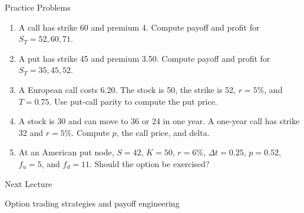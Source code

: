\documentclass[aspectratio=169,11pt]{beamer}
\begin{document}
\begin{frame}{Practice Problems}
    \small
    \begin{enumerate}
        \item A call has strike 60 and premium 4. Compute payoff and profit for \(S_T=52,60,71\).
        \item A put has strike 45 and premium 3.50. Compute payoff and profit for \(S_T=35,45,52\).
        \item A European call costs 6.20. The stock is 50, the strike is 52, \(r=5\%\), and \(T=0.75\). Use put-call parity to compute the put price.
        \item A stock is 30 and can move to 36 or 24 in one year. A one-year call has strike 32 and \(r=5\%\). Compute \(p\), the call price, and delta.
        \item At an American put node, \(S=42\), \(K=50\), \(r=6\%\), \(\Delta t=0.25\), \(p=0.52\), \(f_u=5\), and \(f_d=11\). Should the option be exercised?
    \end{enumerate}
\end{frame}

\begin{frame}
    \vfill
    \begin{center}
        {Next Lecture\par}
        \vspace{0.8em}
        {Option trading strategies and payoff engineering\par}
    \end{center}
    \vfill
\end{frame}
\end{document}
